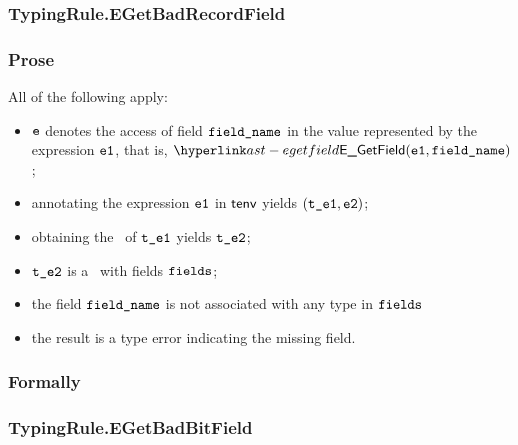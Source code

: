 \subsubsection{TypingRule.EGetBadRecordField \label{sec:TypingRule.EGetBadRecordField}}
\subsubsection{Prose}
All of the following apply:
\begin{itemize}
  \item $\ve$ denotes the access of field $\fieldname$ in the value represented by the expression $\veone$, that is, $\EGetField(\veone, \fieldname)$;
  \item annotating the expression $\veone$ in $\tenv$ yields $(\vteone, \vetwo)$\ProseOrTypeError;
  \item obtaining the \underlyingtype\ of $\vteone$ yields $\vtetwo$\ProseOrTypeError;
  \item $\vtetwo$ is a \structuredtype\ with fields $\fields$;
  \item the field $\fieldname$ is not associated with any type in $\fields$
  \item the result is a type error indicating the missing field.
\end{itemize}
\subsubsection{Formally}
\begin{mathpar}
\end{mathpar}

\subsubsection{TypingRule.EGetBadBitField \label{sec:TypingRule.EGetBadBitField}}
